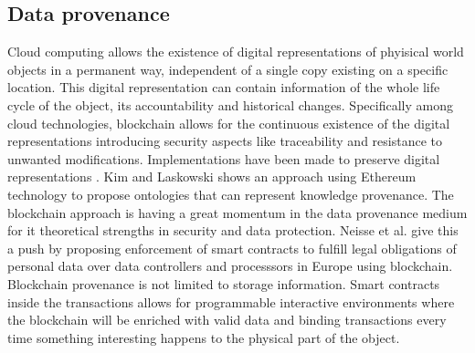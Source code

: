 \subsection{Data provenance}
Cloud computing allows the existence of digital representations of phyisical world objects in a permanent way, independent of a single copy existing on a specific location. This digital representation can contain information of the whole life cycle of the object, its accountability and historical changes. Specifically among cloud technologies, blockchain allows for the continuous existence of the digital representations introducing security aspects like traceability and resistance to unwanted modifications. Implementations have been made to preserve digital representations \cite{provchain}. Kim and Laskowski\cite{ontology} shows an approach using Ethereum technology to propose ontologies that can represent knowledge provenance. The blockchain approach is having a great momentum in the data provenance medium for it theoretical strengths in security and data protection. Neisse et al. \cite{europe} give this a push by proposing enforcement of smart contracts to fulfill legal obligations of personal data over data controllers and processsors in Europe using blockchain. Blockchain provenance is not limited to storage information. Smart contracts inside the transactions allows for programmable interactive environments \cite{ramachandran} where the blockchain will be enriched with valid data and binding transactions every time something interesting happens to the physical part of the object.
